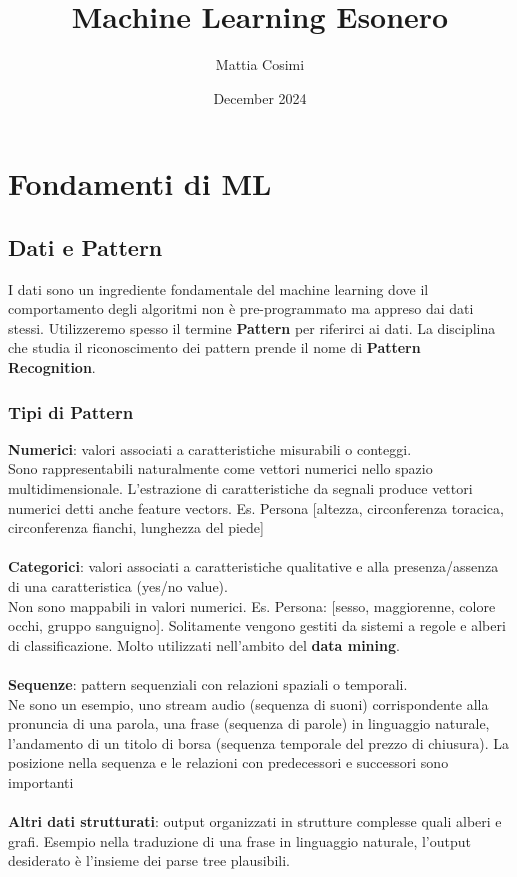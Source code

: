 \documentclass{article}
\title{Machine Learning Esonero}
\author{Mattia Cosimi}
\date{December 2024}
\begin{document}
\maketitle

\section{Fondamenti di ML}
\subsection{Dati e Pattern}
I dati sono un ingrediente fondamentale del machine learning dove il comportamento degli algoritmi non è pre-programmato ma appreso dai dati stessi. Utilizzeremo spesso il termine \textbf{Pattern} per riferirci ai dati. La disciplina che studia il riconoscimento dei pattern prende il nome di \textbf{Pattern Recognition}.
\subsubsection{Tipi di Pattern}
\vspace{10pt}
\textbf{Numerici}: valori associati a caratteristiche misurabili o conteggi.\\
Sono rappresentabili naturalmente come vettori numerici nello spazio multidimensionale. L'estrazione di caratteristiche da segnali produce vettori numerici detti anche feature vectors. Es. Persona [altezza, circonferenza toracica, circonferenza fianchi, lunghezza del piede]
\\\\
\textbf{Categorici}: valori associati a caratteristiche qualitative e alla presenza/assenza di una caratteristica (yes/no value).
\\
Non sono mappabili in valori numerici. Es. Persona: [sesso, maggiorenne, colore occhi, gruppo sanguigno]. Solitamente vengono gestiti da sistemi a regole e alberi di classificazione. Molto utilizzati nell'ambito del \textbf{data mining}.
\\\\
\textbf{Sequenze}: pattern sequenziali con relazioni spaziali o temporali.\\
Ne sono un esempio, uno stream audio (sequenza di suoni) corrispondente alla pronuncia di una parola, una frase (sequenza di parole) in linguaggio naturale, l'andamento di un titolo di borsa (sequenza temporale del prezzo di chiusura). La posizione nella sequenza e le relazioni con predecessori e successori sono importanti
\\\\
\textbf{Altri dati strutturati}: output organizzati in strutture complesse quali alberi e grafi. Esempio nella traduzione di una frase in linguaggio naturale, l'output desiderato è l'insieme dei parse tree plausibili.
\end{document}
